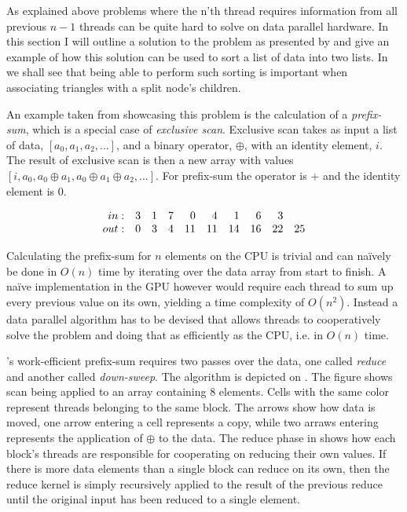 
As explained above problems where the n’th thread requires information from all
previous $n-1$ threads can be quite hard to solve on data parallel hardware. In
this section I will outline a solution to the problem as presented by
\sengupta{} and give an example of how this solution can be used to sort a list
of data into two lists. In  we shall see that being
able to perform such sorting is important when associating triangles with a
split node's children.



An example taken from \sengupta{} showcasing this problem is the calculation of
a \textit{prefix-sum}, which is a special case of \textit{exclusive
  scan}. Exclusive scan takes as input a list of data, $[a_0, a_1, a_2, ...]$,
and a binary operator, $\oplus$, with an identity element, $i$. The result of
exclusive scan is then a new array with values $[i, a_0, a_0 \oplus a_1, a_0
  \oplus a_1 \oplus a_2, ...]$. For prefix-sum the operator is + and the
identity element is 0.

\begin{displaymath}
  \begin{array}{r r r r r r r r r r}
    in: & 3 & 1 & 7 & 0 & 4 & 1 & 6 & 3 \\
    out: & 0 & 3 & 4 & 11 & 11 & 14 & 16 & 22 & 25 \\
  \end{array}
\end{displaymath}

Calculating the prefix-sum for $n$ elements on the CPU is trivial and
can naïvely be done in $O(n)$ time by iterating over the data array
from start to finish. A naïve implementation in the GPU however would
require each thread to sum up every previous value on its own,
yielding a time complexity of $O(n^2)$. Instead a data parallel
algorithm has to be devised that allows threads to cooperatively solve
the problem and doing that as efficiently as the CPU, i.e. in $O(n)$
time.



\sengupta{}'s work-efficient prefix-sum requires two passes over the data, one
called \textit{reduce} and another called \textit{down-sweep}. The algorithm is
depicted on . The figure shows scan being applied to an
array containing 8 elements. Cells with the same color represent threads
belonging to the same block. The arrows show how data is moved, one arrow
entering a cell represents a copy, while two arraws entering represents the
application of $\oplus$ to the data. The reduce phase in 
shows how each block's threads are responsible for cooperating on reducing their
own values. If there is more data elements than a single block can reduce on its
own, then the reduce kernel is simply recursively applied to the result of the
previous reduce until the original input has been reduced to a single element.

